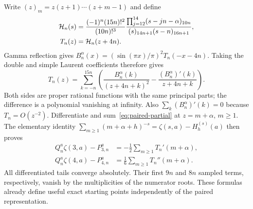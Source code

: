 Write $(z)_m=z(z+1)\cdots(z+m-1)$ and define
\begin{align}
 \mathcal H_n(s)&=\frac{(-1)^n(15n)!^2}{(10n)!^3}
 \frac{\prod_{j=12}^{14}(s-jn-\alpha)_{10n}}
                         {(s)_{14n+1}(s-n)_{16n+1}},\notag\\
 T_n(z)&=\mathcal H_n(z+4n).
 \label{eq:paired-T}
\end{align}
Gamma reflection gives
$B_n^\alpha(x)=(\sin(\pi x)/\pi)^2T_n(-x-4n)$.
Taking the double and simple Laurent coefficients therefore gives
\begin{equation}\label{eq:paired-partial}
 T_n(z)=\sum_{k=-n}^{15n}\left(
 \frac{B_n^\alpha(k)}{(z+4n+k)^2}
 -\frac{(B_n^\alpha)'(k)}{z+4n+k}\right).
\end{equation}
Both sides are proper rational functions with the same principal parts;
the difference is a polynomial vanishing at infinity. Also
$\sum_k(B_n^\alpha)'(k)=0$ because $T_n=O(z^{-2})$.
Differentiate and sum~\eqref{eq:paired-partial} at $z=m+\alpha$,
$m\geq1$. The elementary identity
$\sum_{m\geq1}(m+\alpha+h)^{-s}=\zeta(s,a)-H_h^{(s)}(a)$
then proves
\begin{equation}\label{eq:paired-remainders}
 \begin{split}
 Q_n^a\zeta(3,a)-P_{3,n}^a
      &=-\frac12\sum_{m\geq1}T_n'(m+\alpha),\\
 Q_n^a\zeta(4,a)-P_{4,n}^a
      &=\frac16\sum_{m\geq1}T_n''(m+\alpha).
 \end{split}
\end{equation}
All differentiated tails converge absolutely. Their first $9n$ and
$8n$ sampled terms, respectively, vanish by the multiplicities of the
numerator roots. These formulas already define useful exact starting
points independently of the paired representation.

